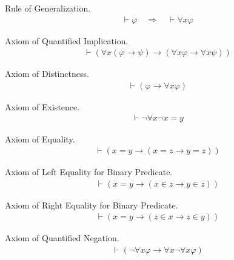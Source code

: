 \begin{axiom}\label{axi:ax-gen} Rule of Generalization. 
\begin{align}
\vdash \varphi\quad\Rightarrow\quad \vdash \forall x
    \varphi\label{eq:ax-gen}\tag{ax-gen}
\end{align}
\end{axiom}
\begin{axiom}\label{axi:ax-4} Axiom of Quantified Implication. 
\begin{align}
\vdash ( \forall x ( \varphi \rightarrow \psi ) \rightarrow ( \forall x \varphi
    \rightarrow \forall x \psi ) )\label{eq:ax-4}\tag{ax-4}
\end{align}
\end{axiom}
\begin{axiom}\label{axi:ax-5} Axiom of Distinctness.  \begin{align}
\vdash ( \varphi \rightarrow \forall x \varphi )\label{eq:ax-5}\tag{ax-5}
\end{align}
\end{axiom}
\begin{axiom}\label{axi:ax-6} Axiom of Existence. 
\begin{align}
\vdash \lnot \forall x \lnot x = y\label{eq:ax-6}\tag{ax-6}
\end{align}
\end{axiom}
\begin{axiom}\label{axi:ax-7} Axiom of Equality.  
\begin{align}
\vdash ( x = y \rightarrow ( x = z \rightarrow y = z )
    )\label{eq:ax-7}\tag{ax-7}
\end{align}
\end{axiom}
\begin{axiom}\label{axi:ax-8} Axiom of Left Equality for Binary Predicate. 
\begin{align}
\vdash ( x = y \rightarrow ( x \in z \rightarrow y \in z )
    )\label{eq:ax-8}\tag{ax-8}
\end{align}
\end{axiom}
\begin{axiom}\label{axi:ax-9} Axiom of Right Equality for Binary Predicate. 
\begin{align}
\vdash ( x = y \rightarrow ( z \in x \rightarrow z \in y )
    )\label{eq:ax-9}\tag{ax-9}
\end{align}
\end{axiom}
\begin{axiom}\label{axi:ax-10} Axiom of Quantified Negation.  
\begin{align}
\vdash ( \lnot \forall x \varphi \rightarrow \forall x \lnot \forall x \varphi
    )\label{eq:ax-10}\tag{ax-10}
\end{align}
\end{axiom}
